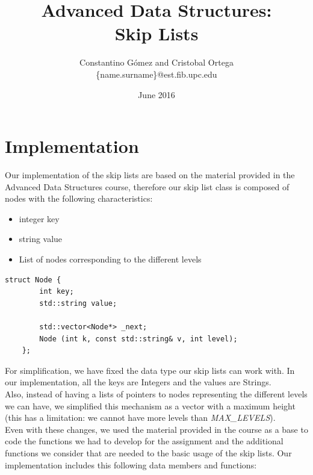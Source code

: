 \documentclass{article}
\title{Advanced Data Structures:\\Skip Lists}
\author{Constantino Gómez and Cristobal Ortega\\\{name.surname\}@est.fib.upc.edu}
\date{June 2016}
\begin{document}
\maketitle

\section{Implementation}
Our implementation of the skip lists are based on the material provided in the Advanced Data Structures course\citep{ads:slides}, therefore our skip list class is composed of nodes with the following characteristics:

\begin{itemize}
    \item integer key
    \item string value
    \item List of nodes corresponding to the different levels
\end{itemize}

\begin{Code}
    \begin{lstlisting}[caption=Class Node, style=myC]
    struct Node {
        int key;
        std::string value;
    
        std::vector<Node*> _next;
        Node (int k, const std::string& v, int level);
    };
    \end{lstlisting}
\end{Code}

For simplification, we have fixed the data type our skip lists can work with. In our implementation, all the keys are Integers and the values are Strings.\\

Also, instead of having a lists of pointers to nodes representing the different levels we can have, we simplified this mechanism as a vector with a maximum height (this has a limitation: we cannot have more levels than \textit{MAX\_LEVELS}).\\

Even with these changes, we used the material provided in the course as a base to code the functions we had to develop for the assignment and the additional functions we consider that are needed to the basic usage of the skip lists. Our implementation includes this following data members and functions:
\end{document}
